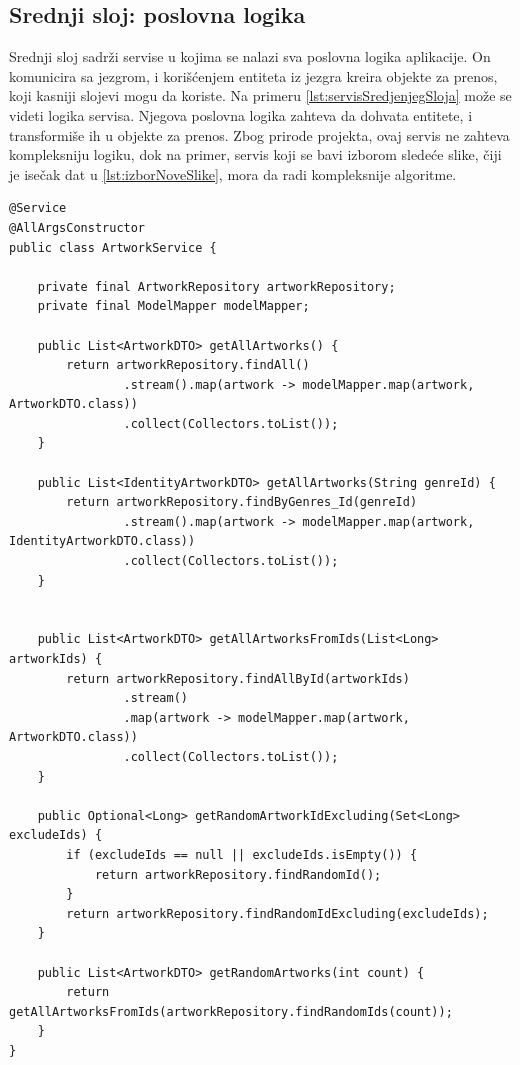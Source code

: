 \documentclass[12pt,oneside]{memoir}
\begin{document}
\subsection{Srednji sloj: poslovna logika}
Srednji sloj sadrži servise u kojima se nalazi sva poslovna logika aplikacije. On komunicira sa jezgrom, i korišćenjem 
entiteta iz jezgra kreira objekte za prenos, koji kasniji slojevi mogu da koriste. 
Na primeru \ref{lst:servisSredjenjegSloja} može se videti logika 
servisa. Njegova poslovna logika zahteva da dohvata entitete, i transformiše ih u objekte za prenos. 
Zbog prirode projekta, ovaj servis ne zahteva kompleksniju logiku, dok na primer, servis koji se bavi izborom sledeće 
slike, čiji je isečak dat u \ref{lst:izborNoveSlike}, mora da radi kompleksnije algoritme. 
\begin{lstlisting}
@Service
@AllArgsConstructor
public class ArtworkService {

    private final ArtworkRepository artworkRepository;
    private final ModelMapper modelMapper;

    public List<ArtworkDTO> getAllArtworks() {
        return artworkRepository.findAll()
                .stream().map(artwork -> modelMapper.map(artwork, ArtworkDTO.class))
                .collect(Collectors.toList());
    }

    public List<IdentityArtworkDTO> getAllArtworks(String genreId) {
        return artworkRepository.findByGenres_Id(genreId)
                .stream().map(artwork -> modelMapper.map(artwork, IdentityArtworkDTO.class))
                .collect(Collectors.toList());
    }


    public List<ArtworkDTO> getAllArtworksFromIds(List<Long> artworkIds) {
        return artworkRepository.findAllById(artworkIds)
                .stream()
                .map(artwork -> modelMapper.map(artwork, ArtworkDTO.class))
                .collect(Collectors.toList());
    }

    public Optional<Long> getRandomArtworkIdExcluding(Set<Long> excludeIds) {
        if (excludeIds == null || excludeIds.isEmpty()) {
            return artworkRepository.findRandomId();
        }
        return artworkRepository.findRandomIdExcluding(excludeIds);
    }

    public List<ArtworkDTO> getRandomArtworks(int count) {
        return getAllArtworksFromIds(artworkRepository.findRandomIds(count));
    }
}
\end{lstlisting}
\end{document}
